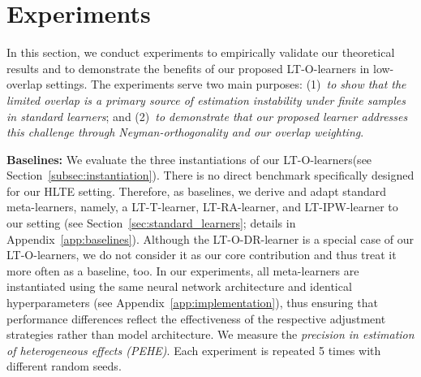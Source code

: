 \documentclass{article}
\theoremstyle{plain}
\theoremstyle{definition}
\theoremstyle{remark}
\newcommand{\1}{\mathds{1}}                %
\newcommand{\methods}{LT-O-learners\xspace}
\newcommand{\LTT}{LT-T-learner\xspace}
\newcommand{\LTRA}{LT-RA-learner\xspace}
\newcommand{\LTIPW}{LT-IPW-learner\xspace}
\newcommand{\DR}{LT-O-DR-learner\xspace}
\begin{document}
\vspace{-0.2cm}

\section{Experiments}

In this section, we conduct experiments to empirically validate our theoretical results and to demonstrate the benefits of our proposed \methods in low-overlap settings. The experiments serve two main purposes: (1)~\textit{to show that the limited overlap is a primary source of estimation instability under finite samples in standard learners}; and (2)~\textit{to demonstrate that our proposed learner addresses this challenge through Neyman-orthogonality and our overlap weighting}.


\textbf{Baselines:} We evaluate the three instantiations of our \methods (see Section~\ref{subsec:instantiation}). %
There is no direct benchmark specifically designed for our HLTE setting. Therefore, as baselines, we derive and adapt standard meta-learners, namely, a \LTT, \LTRA, and \LTIPW to our setting (see Section~\ref{sec:standard_learners}; details in Appendix~\ref{app:baselines}). Although the \DR is a special case of our \methods, we do not consider it as our core contribution and thus treat it more often as a baseline, too.
In our experiments, all meta-learners are instantiated using the same neural network architecture and identical hyperparameters (see Appendix~\ref{app:implementation}), thus ensuring that performance differences reflect the effectiveness of the respective adjustment strategies rather than model architecture. We measure the \textit{precision in estimation of heterogeneous effects (PEHE)}. Each experiment is repeated 5 times with different random seeds. 

\end{document}
